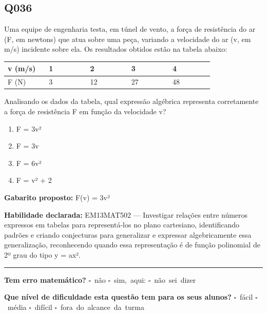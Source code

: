 \documentclass[11pt,a4paper]{article}
\begin{document}
\begin{samepage}
\subsection*{Q036}
Uma equipe de engenharia testa, em túnel de vento, a força de resistência do ar (F, em newtons) que atua sobre uma peça, variando a velocidade do ar (v, em m/s) incidente sobre ela. Os resultados obtidos estão na tabela abaixo:

\begin{center}
\begin{tabular}{|p{0.172\linewidth}|p{0.172\linewidth}|p{0.172\linewidth}|p{0.172\linewidth}|p{0.172\linewidth}|}
\hline
\textbf{v (m/s)} & \textbf{1} & \textbf{2} & \textbf{3} & \textbf{4} \\
\hline
F (N) & 3 & 12 & 27 & 48 \\
\hline
\end{tabular}
\end{center}

Analisando os dados da tabela, qual expressão algébrica representa corretamente a força de resistência F em função da velocidade v?
\begin{enumerate}[label=(\alph*),nosep,leftmargin=*]
\item F = 3v²
\item F = 3v
\item F = 6v²
\item F = v² + 2
\end{enumerate}

\textbf{Gabarito proposto:} F(v) = 3v²

\textbf{Habilidade declarada:} EM13MAT502 --- Investigar relações entre números expressos em tabelas para representá-los no plano cartesiano, identificando padrões e criando conjecturas para generalizar e expressar algebricamente essa generalização, reconhecendo quando essa representação é de função polinomial de 2º grau do tipo y = ax².
\end{samepage}

\noindent\rule{\linewidth}{0.4pt}
\textbf{Tem erro matemático?}\quad
\mbox{$\square$~não} \quad \mbox{$\square$~sim, aqui:} \underline{\hspace{5cm}}
\quad \mbox{$\square$~não sei dizer}

\textbf{Que nível de dificuldade esta questão tem para os seus alunos?}\quad
\mbox{$\square$~fácil} \quad \mbox{$\square$~média} \quad
\mbox{$\square$~difícil} \quad \mbox{$\square$~fora do alcance da turma}
\end{document}
